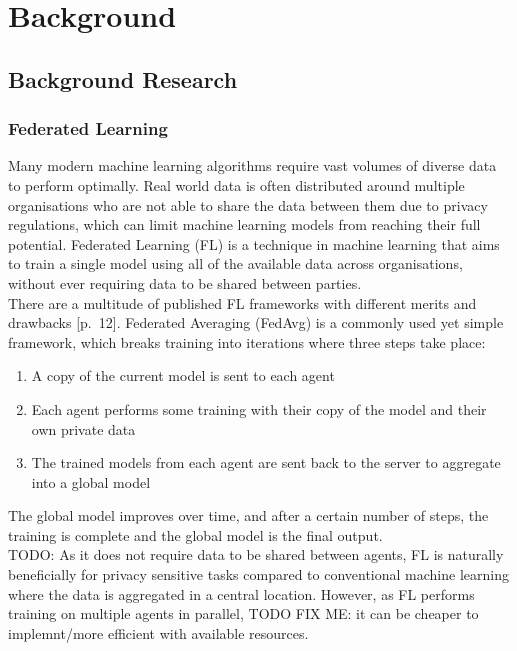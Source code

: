 \chapter{Background}
\section{Background Research}
\subsection{Federated Learning}
Many modern machine learning algorithms require vast volumes of diverse data to perform optimally. Real world data is often distributed around multiple organisations who are not able to share the data between them due to privacy regulations, which can limit machine learning models from reaching their full potential. Federated Learning (FL) \cite{survey_on_fed_learning} is a technique in machine learning that aims to train a single model using all of the available data across organisations, without ever requiring data to be shared between parties. \\

There are a multitude of published FL frameworks with different merits and drawbacks \cite{survey_on_fed_learning}[p.~12]. Federated Averaging (FedAvg) \cite{fed_learning} is a commonly used yet simple framework, which breaks training into iterations where three steps take place:
\begin{enumerate}
	\item A copy of the current model is sent to each agent
	\item Each agent performs some training with their copy of the model and their own private data
	\item The trained models from each agent are sent back to the server to aggregate into a global model
\end{enumerate}
The global model improves over time, and after a certain number of steps, the training is complete and the global model is the final output. \\

TODO: \cite{simfl}
As it does not require data to be shared between agents, FL is naturally beneficially for privacy sensitive tasks compared to conventional machine learning where the data is aggregated in a central location. However, as FL performs training on multiple agents in parallel, TODO FIX ME: it can be cheaper to implemnt/more efficient with available resources.

